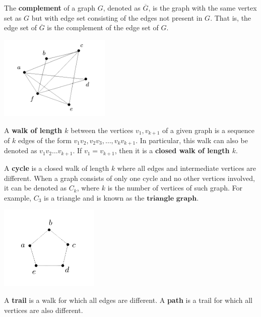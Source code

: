 \documentclass[11pt]{article}
\theoremstyle{definition}
\begin{document}
The \textbf{complement} of a graph $G$, denoted as $\overline{G}$, is the graph with the same vertex set as $G$ but with edge set consisting of the edges not present in $G$. That is, the edge set of $\overline{G}$ is the complement of the edge set of $G$. 

\begin{center}
    \centering
    \includegraphics[width=\textwidth, height=4cm, keepaspectratio=true]{images/complement.jpeg}
    \label{fig:complement}
\end{center}

A \textbf{walk of length $k$} between the vertices $v_1,v_{k+1}$ of a given graph is a sequence of $k$ edges of the form $v_1 v_2, v_2 v_3, \ldots, v_k v_{k+1}$. In particular, this walk can also be denoted as $v_1 v_2 \ldots v_{k+1}$. If $v_1=v_{k+1}$, then it is a \textbf{closed walk of length $k$}.

A \textbf{cycle} is a closed walk of length $k$ where all edges and intermediate vertices are different. When a graph consists of only one cycle and no other vertices involved, it can be denoted as $C_k$, where $k$ is the number of vertices of such graph. For example, $C_3$ is a triangle and is known as the $\textbf{triangle graph}$. 

\begin{center}
    \centering
    \includegraphics[width=\textwidth, height=4cm, keepaspectratio=true]{images/cycle.jpeg}
    \label{fig:cycle}
\end{center}

A \textbf{trail} is a walk for which all edges are different. A \textbf{path} is a trail for which all vertices are also different.
\end{document}
